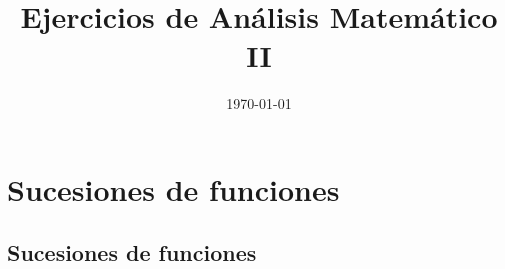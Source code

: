 \documentclass[11pt,spanish]{article} %
\title{Ejercicios de Análisis Matemático II}
\author{ }
\date{\today}
\begin{document}
\maketitle
\tableofcontents %
\newpage
\setlength\parindent{0pt} %

\section{Sucesiones de funciones}
\subsection{Sucesiones de funciones}
\end{document}
